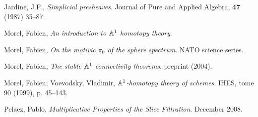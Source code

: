 \documentclass{amsart}%
\begin{document}
\begin{thebibliography}{OOOO}



     Jardine, J.F., {\it Simplicial
    presheaves}. Journal of Pure and Applied Algebra, {\bf 47} (1987)
  35--87.



     Morel, Fabien, {\it An introduction to $\mathbb{A}^1$
    homotopy theory}.

     Morel, Fabien, {\it On the motivic $\pi_0$
    of the sphere spectrum}. NATO science series.

     Morel, Fabien, {\it The stable $\mathbb{A}^1$
    connectivity theorems}. preprint (2004).

     Morel, Fabien; Voevodsky, Vladimir, {\it $\mathbb{A}^1$-homotopy theory of schemes}. IHES, tome 90 (1999), p. 45--143. 





     Pelaez, Pablo, {\it Multiplicative Properties
    of the Slice Filtration}.  December 2008.



\end{thebibliography}
\end{document}
